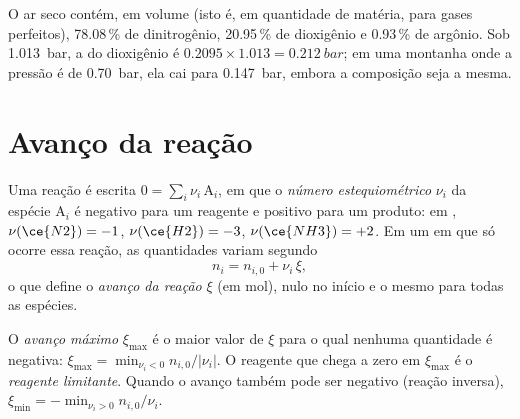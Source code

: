 \begin{example}[O ar]\label{ex:b1:extent-q-and-k:air}
O ar seco contém, em volume (isto é, em quantidade de matéria, para
gases perfeitos), 78.08\,\% de dinitrogênio, 20.95\,\% de dioxigênio e
0.93\,\% de argônio. Sob \qty{1.013}{bar}, a  do
dioxigênio é $0.2095 \times
1.013 = \qty{0.212}{bar}$; em uma montanha onde a pressão é de
\qty{0.70}{bar}, ela cai para \qty{0.147}{bar}, embora a composição seja
a mesma.
\end{example}

\section{Avanço da reação}

\begin{definition}\label{def:b1:extent-q-and-k:extent}
Uma reação é escrita $0 = \sum_i \nu_i\,\mathrm{A}_i$, em que o
\emph{número estequiométrico} $\nu_i$ da
espécie $\mathrm{A}_i$ é negativo para um reagente e positivo para um
produto: em , $\nu(\ce{N2}) = -1$, $\nu(\ce{H2}) = -3$,
$\nu(\ce{NH3}) = +2$. Em um  em que só ocorre essa reação,
as quantidades variam segundo
\[
  n_i = n_{i,0} + \nu_i\,\xi ,
\]
o que define o \emph{avanço da reação}
$\xi$ (em mol), nulo no início e o mesmo para todas as espécies.
\end{definition}

\begin{definition}\label{def:b1:extent-q-and-k:max-extent}
O \emph{avanço máximo} $\xi_{\max}$ é o maior
valor de $\xi$ para o qual nenhuma quantidade é negativa: $\xi_{\max} = \min_{\nu_i <
0} n_{i,0}/|\nu_i|$. O reagente que chega a zero em $\xi_{\max}$ é o
\emph{reagente limitante}. Quando o avanço
também pode ser negativo (reação inversa), $\xi_{\min} = -\min_{\nu_i > 0}
n_{i,0}/\nu_i$.
\end{definition}

